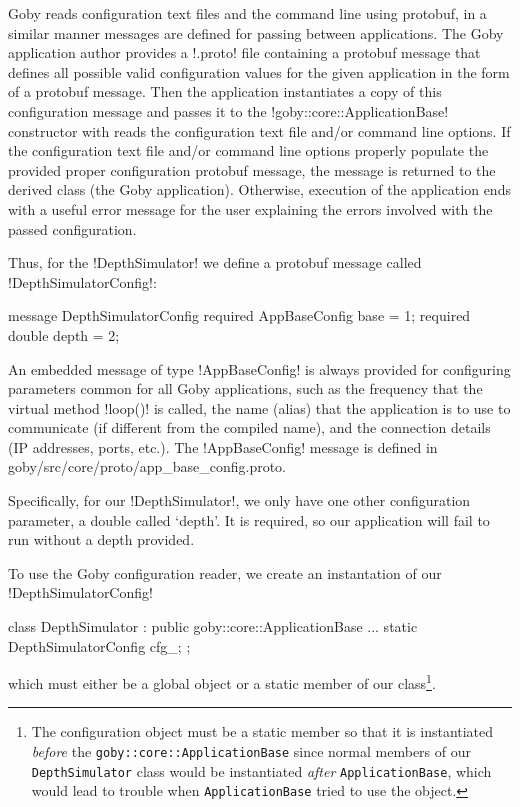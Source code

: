 Goby reads configuration text files and the command line using \gls{protobuf}, in a similar manner messages are defined for passing between applications. The Goby application author provides a !.proto! file containing a protobuf message that defines all possible valid configuration values for the given application in the form of a protobuf message. Then the application instantiates a copy of this configuration message and passes it to the !goby::core::ApplicationBase! constructor with reads the configuration text file and/or command line options. If the configuration text file and/or command line options properly populate the provided proper configuration protobuf message, the message is returned to the derived class (the Goby application). Otherwise, execution of the application ends with a useful error message for the user explaining the errors involved with the passed configuration. 

Thus, for the !DepthSimulator! we define a protobuf message called !DepthSimulatorConfig!:
\begin{boxedverbatim}
message DepthSimulatorConfig
{
  required AppBaseConfig base = 1;
  required double depth = 2;
}
\end{boxedverbatim}
\resetbvlinenumber

An embedded message of type !AppBaseConfig! is always provided for configuring parameters common for all Goby applications, such as the frequency that the virtual method !loop()! is called, the name (alias) that the application is to use to communicate (if different from the compiled name), and the connection details (IP addresses, ports, etc.). The !AppBaseConfig! message is defined in goby/src/core/proto/app\_base\_config.proto.

Specifically, for our !DepthSimulator!, we only have one other configuration parameter, a double called `depth'. It is required, so our application will fail to run without a depth provided.

To use the Goby configuration reader, we create an instantation of our !DepthSimulatorConfig!
\begin{boxedverbatim}
class DepthSimulator : public goby::core::ApplicationBase
{ 
...
    static DepthSimulatorConfig cfg_;
};
\end{boxedverbatim}
\resetbvlinenumber
which must either be a global object or a static member of our class\footnote{The configuration object must be a static member so that it is instantiated \textit{before} the \texttt{goby::core::ApplicationBase} since normal members of our \texttt{DepthSimulator} class would be instantiated \textit{after} \texttt{ApplicationBase}, which would lead to trouble when \texttt{ApplicationBase} tried to use the object.}.

